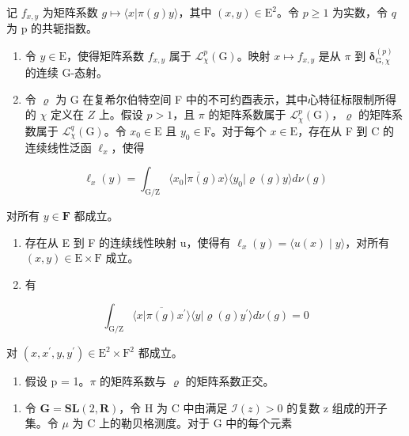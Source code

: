 记 \(f_{x,y}\) 为矩阵系数 \(g \mapsto \langle x | \pi(g)y \rangle\)，其中 \((x, y) \in \mathrm{E}^{2}\)。令 \(p \geqslant 1\) 为实数，令 \(q\) 为 p 的共轭指数。

\begin{enumerate}
\def\labelenumi{\alph{enumi})}
\item
  令 \(y \in \mathrm{E}\)，使得矩阵系数 \(f_{x,y}\) 属于 \(\mathcal{L}_{\chi}^{p}(\mathrm{G})\)。映射 \(x \mapsto f_{x,y}\) 是从 \(\pi\) 到 \(\boldsymbol{\delta}_{\mathrm{G},\chi}^{(p)}\) 的连续 G-态射。
\item
  令 \(\varrho\) 为 G 在复希尔伯特空间 F 中的不可约酉表示，其中心特征标限制所得的 \(\chi\) 定义在 \(Z\) 上。假设 \(p > 1\)，且 \(\pi\) 的矩阵系数属于 \(\mathcal{L}_{\chi}^{p}(\mathrm{G})\)，\(\varrho\) 的矩阵系数属于 \(\mathcal{L}_{\chi}^{q}(\mathrm{G})\)。令 \(x_0 \in \mathrm{E}\) 且 \(y_0 \in \mathrm{F}\)。对于每个 \(x \in \mathrm{E}\)，存在从 F 到 C 的连续线性泛函 \(\ell_x\)，使得
\end{enumerate}

\[
\ell_ {x} (y) = \int_ {\mathrm{G/Z}} \overline {{\langle x _ {0} | \pi (g) x \rangle}} \langle y _ {0} | \varrho (g) y \rangle d \nu (g)
\]

对所有 \(y \in \mathbf{F}\) 都成立。

\begin{enumerate}
\def\labelenumi{\alph{enumi})}
\setcounter{enumi}{2}
\item
  存在从 E 到 F 的连续线性映射 u，使得有 \(\ell_{x}(y)=\langle u(x)\mid y\rangle\)，对所有 \((x,y)\in\mathrm{E}\times\mathrm{F}\) 成立。
\item
  有
\end{enumerate}

\[
\int_ {\mathrm{G} / \mathrm{Z}} \overline {{\langle x | \pi (g) x ^ {\prime} \rangle}} \langle y | \varrho (g) y ^ {\prime} \rangle d \nu (g) = 0
\]

对 \((x,x^{\prime},y,y^{\prime})\in \mathrm{E}^{2}\times \mathrm{F}^{2}\) 都成立。

\begin{enumerate}
\def\labelenumi{\alph{enumi})}
\setcounter{enumi}{4}
\tightlist
\item
  假设 p = 1。\(\pi\) 的矩阵系数与 \(\varrho\) 的矩阵系数正交。
\end{enumerate}

\begin{enumerate}
\def\labelenumi{\arabic{enumi})}
\setcounter{enumi}{15}
\tightlist
\item
  令 \(\mathbf{G} = \mathbf{S}\mathbf{L}(2, \mathbf{R})\)，令 H 为 C 中由满足 \(\mathcal{I}(z) > 0\) 的复数 z 组成的开子集。令 \(\mu\) 为 C 上的勒贝格测度。对于 G 中的每个元素
\end{enumerate}

